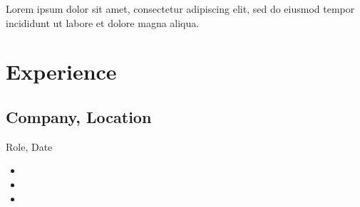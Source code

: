 \documentclass[11pt]{article}
\newcommand{\displayfullname}{%
    \begin{center}
    {\fontsize{\namefontsize}{\dimexpr1.2\namefontsize}\selectfont\fullname}
    \end{center}
    \namesep %
}
\newcommand{\displaycontactinfo}{%
  \begin{center}
    \ifthenelse{\isundefined{\mylocation}}{}{%
        \mylocation\separator
    }%
    \ifthenelse{\isundefined{\mytel}}{}{%
        \mytel\separator
    }%
    \ifthenelse{\isundefined{\myemail}}{}{%
        \myemail\separator
    }%
    \ifthenelse{\isundefined{\mygithub}}{}{%
        \mygithub\separator
    }%
    \ifthenelse{\isundefined{\mylinkedin}}{}{%
        \mylinkedin
    }%
    \end{center}
}
\newcommand{\namefontsize}{14pt}
\newcommand{\namesep}{\vspace{0.5em}}
\newcommand{\separator}{\ | \ }
\begin{document}
\displayfullname
\displaycontactinfo

\vspace{0.75em}

Lorem ipsum dolor sit amet, consectetur adipiscing elit, sed do eiusmod tempor incididunt ut labore et dolore magna aliqua.

\vspace{0.75em}

\section*{Experience}

\vspace{0.5em}
\subsection{Company, Location}
Role, Date
\begin{itemize}
	\item
	\item
	\item
\end{itemize}

\newpage
\layout*
\end{document}
